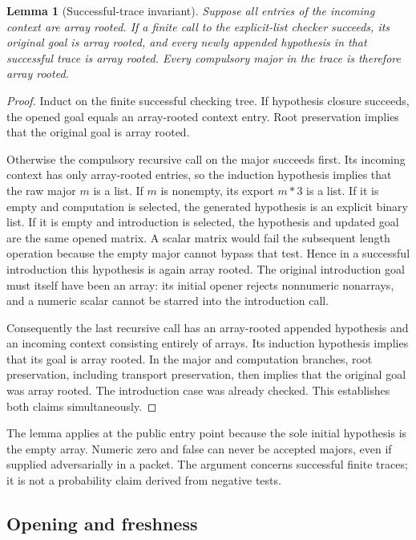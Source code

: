 \documentclass[11pt,letterpaper]{article}
\newtheorem{lemma}[theorem]{Lemma}
\theoremstyle{definition}\newtheorem{definition}[theorem]{Definition}
\theoremstyle{remark}\newtheorem{remark}[theorem]{Remark}
\begin{document}
\begin{lemma}[Successful-trace invariant]
\label{lem:successful-array-invariant}
Suppose all entries of the incoming context are array rooted.  If a
finite call to the explicit-list checker succeeds, its original goal
is array rooted, and every newly appended hypothesis in that successful
trace is array rooted.  Every compulsory major in the trace is
therefore array rooted.
\end{lemma}
\begin{proof}
Induct on the finite successful checking tree.  If hypothesis closure
succeeds, the opened goal equals an array-rooted context entry.  Root
preservation implies that the original goal is array rooted.

Otherwise the compulsory recursive call on the major succeeds first.
Its incoming context has only array-rooted entries, so the induction
hypothesis implies that the raw major $m$ is a list.  If $m$ is nonempty,
its export $m*3$ is a list.  If it is empty and computation is selected,
the generated hypothesis is an explicit binary list.  If it is empty
and introduction is selected, the hypothesis and updated goal are the
same opened matrix.  A scalar matrix would fail the subsequent length
operation because the empty major cannot bypass that test.  Hence in
a successful introduction this hypothesis is again array rooted.
The original introduction goal must itself have been an array: its
initial opener rejects nonnumeric nonarrays, and a numeric scalar
cannot be starred into the introduction call.

Consequently the last recursive call has an array-rooted appended
hypothesis and an incoming context consisting entirely of arrays.
Its induction hypothesis implies that its goal is array rooted.
In the major and computation branches, root preservation, including
transport preservation, then implies that the original goal was array
rooted.  The introduction case was already checked.  This establishes
both claims simultaneously.
\end{proof}

The lemma applies at the public entry point because the sole initial
hypothesis is the empty array.  Numeric zero and false can never be
accepted majors, even if supplied adversarially in a packet.  The
argument concerns successful finite traces; it is not a probability
claim derived from negative tests.

\subsection{Opening and freshness}
\end{document}
